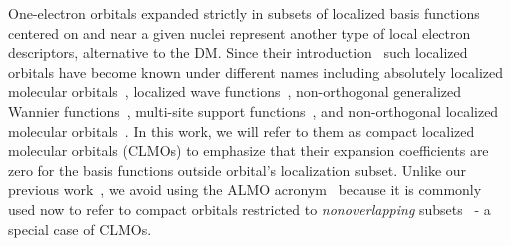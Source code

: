 \documentclass[10pt,amsmath,twocolumn,aps,prl,superscriptaddress,floatfix]{revtex4-1}
\begin{document}
One-electron orbitals expanded strictly in subsets of localized basis functions centered on and near a given nuclei 
represent another type of local electron descriptors, alternative to the DM. 
Since their introduction~\cite{matsuoka1977expansion, stoll1977on, mehler1977self} such localized orbitals have become known under different names including absolutely localized molecular orbitals~\cite{stoll1980use}, localized wave functions~\cite{ordejon1995linear}, non-orthogonal generalized Wannier functions~\cite{skylaris2005introducing}, multi-site support functions~\cite{nakata2015optimized}, and non-orthogonal localized molecular orbitals~\cite{burger2008linear}. 
In this work, we will refer to them as compact localized molecular orbitals (CLMOs) to emphasize that their expansion coefficients are zero for the basis functions outside orbital's localization subset. Unlike our previous work~\cite{khaliullin2013efficient}, we avoid using the ALMO acronym~\cite{stoll1980use} because it is commonly used now to refer to compact orbitals restricted to \emph{nonoverlapping} subsets~\cite{khaliullin2006efficient, khaliullin2007unravelling, khaliullin2008analysis, horn2013unrestricted} - a special case of CLMOs. 

\end{document}
